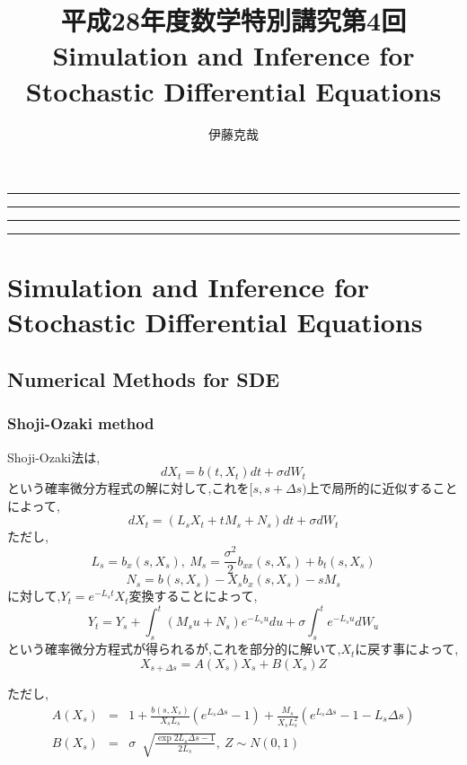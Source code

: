 \documentclass[a4paper,dvipdfmx]{jreport}
\title{平成28年度数学特別講究第4回\\Simulation and Inference for Stochastic Differential Equations}
\author{伊藤克哉}
\makeatletter
\numberwithin{equation}{section}
\def\eqa{\begin{eqnarray}}
\def\eqax{\end{eqnarray}}
\renewcommand{\maketitle}{\begin{titlepage}%
    \let\footnotesize\small
    \let\footnoterule\relax
    \parindent \z@
    \reset@font
    \null
    \vskip 50\p@
    \begin{center}
      \hrule height 1pt
      \vskip 2pt 
      \hrule
      \vskip 3pt
      {\huge \bfseries \strut \@title \strut}\par
      \vskip 2pt
      \hrule
      \vskip 2pt
      \hrule height 1pt
    \end{center}
    \vskip 50\p@
    \begin{flushright}
      \Large \@author \par
    \end{flushright}
    \vfil
    \null
    \begin{flushright}
        {\small \@date}%
    \end{flushright}
  \end{titlepage}%
  \setcounter{footnote}{0}%
}
\makeatother
\begin{document}
\maketitle
\tableofcontents


\chapter{Simulation and Inference for Stochastic Differential Equations}

\section{Numerical Methods for SDE}
\subsection{Shoji-Ozaki method}
Shoji-Ozaki法は,
\[
dX_t = b (t,X_t) dt + \sigma dW_t
\]
という確率微分方程式の解に対して,これを$[s,s+\Delta s)$上で局所的に近似することによって,
\[
dX_t = (L_s X_t + tM_s + N_s )dt+ \sigma  dW_t
\]
ただし,
\[
L_s = b_x(s,X_s) , \ M_s = \frac{\sigma^2}{2} b_{xx} (s,X_s) + b_t(s,X_s)
\]
\[
N_s = b(s,X_s) - X_s b_x(s,X_s) - sM_s
\]
に対して,$Y_t = e^{-L_s t } X_t $変換することによって,
\[
Y_t = Y_s + \int_s^t (M_s u + N_s ) e^{-L_s u} du + \sigma \int_{s}^t e^{-L_s u} dW_u
\]
という確率微分方程式が得られるが,これを部分的に解いて,$X_t$に戻す事によって,
\[
X_{s+\Delta s} = A(X_s)X_s + B(X_s) Z
\]

ただし,
\eqa
A(X_s) &=& 1 + \frac{b(s,X_s)}{X_s L_s} (e^{L_s \Delta s} -1 ) +
\frac{M_s}{X_s L_s^2} (e^{L_s \Delta s} -1  - L_s \Delta s) \\
B(X_s) &=& \sigma\ \sqrt[]{ \frac{\exp{2L_s \Delta s} -1 }{2L_s}},\ Z\sim N(0,1)
\eqax
\end{document}
